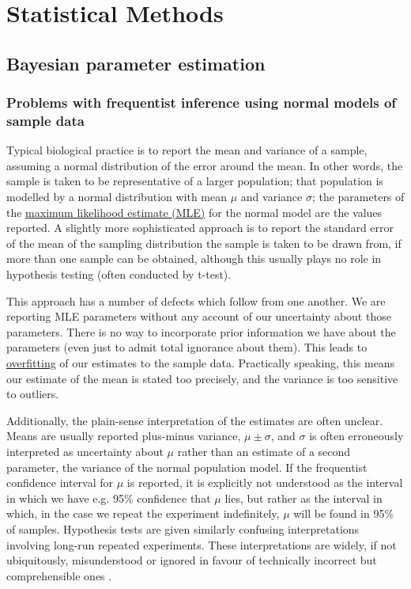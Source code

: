 \section{Statistical Methods}
\subsection{Bayesian parameter estimation}
\label{ssec:Bayes}
\subsubsection{Problems with frequentist inference using normal models of sample data}
Typical biological practice is to report the mean and variance of a sample, assuming a normal distribution of the error around the mean. In other words, the sample is taken to be representative of a larger population; that population is modelled by a normal distribution with mean $\mu$ and variance $\sigma$; the parameters of the \hyperref[MLE]{maximum likelihood estimate (MLE)} for the normal model are the values reported. A slightly more sophisticated approach is to report the standard error of the mean of the sampling distribution the sample is taken to be drawn from, if more than one sample can be obtained, although this usually plays no role in hypothesis testing (often conducted by t-test).

This approach has a number of defects which follow from one another. We are reporting MLE parameters without any account of our uncertainty about those parameters. There is no way to incorporate prior information we have about the parameters (even just to admit total ignorance about them). This leads to \hyperref[overfit]{overfitting} of our estimates to the sample data. Practically speaking, this means our estimate of the mean is stated too precisely, and the variance is too sensitive to outliers.

Additionally, the plain-sense interpretation of the estimates are often unclear. Means are usually reported plus-minus variance, $\mu\pm\sigma$, and $\sigma$ is often erroneously interpreted as uncertainty about $\mu$ rather than an estimate of a second parameter, the variance of the normal population model. If the frequentist confidence interval for $\mu$ is reported, it is explicitly not understood as the interval in which we have e.g. 95$\%$ confidence that $\mu$ lies, but rather as the interval in which, in the case we repeat the experiment indefinitely, $\mu$ will be found in 95$\%$ of samples. Hypothesis tests are given similarly confusing interpretations involving long-run repeated experiments. These interpretations are widely, if not ubiquitously, misunderstood or ignored in favour of technically incorrect but comprehensible ones \cite{Hoekstra2014, Greenland2016}.


